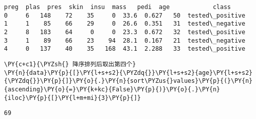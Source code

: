             \begin{tcolorbox}[breakable, size=fbox, boxrule=.5pt, pad at break*=1mm, opacityfill=0]
\begin{Verbatim}[commandchars=\\\{\}]
   preg  plas  pres  skin  insu  mass   pedi  age            class
0     6   148    72    35     0  33.6  0.627   50  tested\_positive
1     1    85    66    29     0  26.6  0.351   31  tested\_negative
2     8   183    64     0     0  23.3  0.672   32  tested\_positive
3     1    89    66    23    94  28.1  0.167   21  tested\_negative
4     0   137    40    35   168  43.1  2.288   33  tested\_positive
\end{Verbatim}
\end{tcolorbox}
        
    \begin{tcolorbox}[breakable, size=fbox, boxrule=1pt, pad at break*=1mm,colback=cellbackground, colframe=cellborder]
\begin{Verbatim}[commandchars=\\\{\}]
\PY{c+c1}{\PYZsh{} 降序排列后取出第四个}
\PY{n}{data}\PY{p}{[}\PY{l+s+s2}{\PYZdq{}}\PY{l+s+s2}{age}\PY{l+s+s2}{\PYZdq{}}\PY{p}{]}\PY{o}{.}\PY{n}{sort\PYZus{}values}\PY{p}{(}\PY{n}{ascending}\PY{o}{=}\PY{k+kc}{False}\PY{p}{)}\PY{o}{.}\PY{n}{iloc}\PY{p}{[}\PY{l+m+mi}{3}\PY{p}{]}
\end{Verbatim}
\end{tcolorbox}

            \begin{tcolorbox}[breakable, size=fbox, boxrule=.5pt, pad at break*=1mm, opacityfill=0]
\begin{Verbatim}[commandchars=\\\{\}]
69
\end{Verbatim}
\end{tcolorbox}
